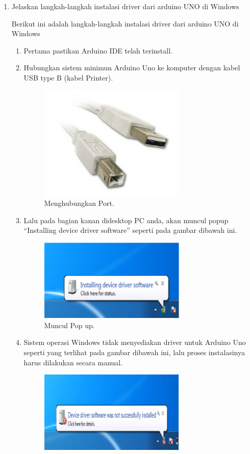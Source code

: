\begin{enumerate}
    \item Jelaskan langkah-langkah instalasi driver dari arduino UNO di Windows
  	\par Berikut ini adalah langkah-langkah instalasi driver dari arduino UNO di Windows
	\begin{enumerate}
		\item Pertama pastikan Arduino IDE telah terinstall.		
		\item Hubungkan sistem minimun Arduino Uno ke komputer dengan kabel USB type B (kabel Printer).	
		\begin{figure}[ht]
				\includegraphics[width=7cm]{figures/5/1174087/Teori/1.png}
				\centering
				\caption{Menghubungkan Port.}
		\end{figure}		
		\item Lalu pada bagian kanan didesktop PC anda, akan muncul popup “Installing device driver software” seperti pada gambar dibawah ini.
		\begin{figure}[ht]
				\includegraphics[width=7cm]{figures/5/1174087/Teori/2.png}
				\centering
				\caption{Muncul Pop up.}
		\end{figure}	
		\item Sistem operasi Windows tidak menyediakan driver untuk Arduino Uno seperti yang terlihat pada gambar dibawah ini, lalu proses instalasinya harus dilakukan secara manual.
		\begin{figure}[ht]
				\includegraphics[width=7cm]{figures/5/1174087/Teori/3.png}

\end{figure}
\end{enumerate}
\end{enumerate}
